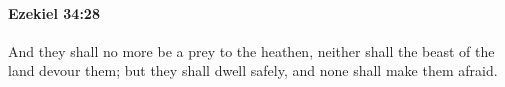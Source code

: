 
		\paragraph{Ezekiel 34:28} %
			\label{EZEKIEL-34-28}

			And they shall no more be a prey to the heathen, neither shall the beast of the land devour them; but they shall dwell safely, and none shall make them afraid.


